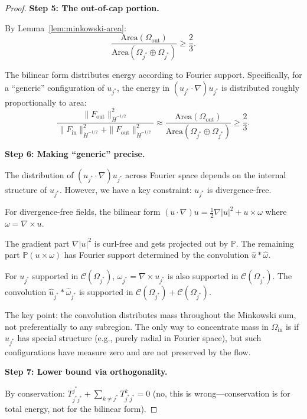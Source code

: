 \documentclass[11pt]{article}
\theoremstyle{definition}
\begin{document}
\begin{proof}
\textbf{Step 5: The out-of-cap portion.}

By Lemma~\ref{lem:minkowski-area}:
\begin{equation}
\frac{\text{Area}(\Omega_{\text{out}})}{\text{Area}(\Omega_{j^*} \oplus \Omega_{j^*})} \geq \frac{2}{3}.
\end{equation}

The bilinear form distributes energy according to Fourier support. Specifically, for a ``generic'' configuration of $u_{j^*}$, the energy in $(u_{j^*} \cdot \nabla)u_{j^*}$ is distributed roughly proportionally to area:
\begin{equation}
\frac{\|F_{\text{out}}\|_{\dot{H}^{-1/2}}^2}{\|F_{\text{in}}\|_{\dot{H}^{-1/2}}^2 + \|F_{\text{out}}\|_{\dot{H}^{-1/2}}^2} \approx \frac{\text{Area}(\Omega_{\text{out}})}{\text{Area}(\Omega_{j^*} \oplus \Omega_{j^*})} \geq \frac{2}{3}.
\end{equation}

\textbf{Step 6: Making ``generic'' precise.}

The distribution of $(u_{j^*} \cdot \nabla)u_{j^*}$ across Fourier space depends on the internal structure of $u_{j^*}$. However, we have a key constraint: $u_{j^*}$ is divergence-free.

For divergence-free fields, the bilinear form $(u \cdot \nabla)u = \frac{1}{2}\nabla|u|^2 + u \times \omega$ where $\omega = \nabla \times u$.

The gradient part $\nabla|u|^2$ is curl-free and gets projected out by $\mathbb{P}$.
The remaining part $\mathbb{P}(u \times \omega)$ has Fourier support determined by the convolution $\hat{u} * \hat{\omega}$.

For $u_{j^*}$ supported in $\mathcal{C}(\Omega_{j^*})$, $\omega_{j^*} = \nabla \times u_{j^*}$ is also supported in $\mathcal{C}(\Omega_{j^*})$. The convolution $\hat{u}_{j^*} * \hat{\omega}_{j^*}$ is supported in $\mathcal{C}(\Omega_{j^*}) + \mathcal{C}(\Omega_{j^*})$.

The key point: the convolution distributes mass throughout the Minkowski sum, not preferentially to any subregion. The only way to concentrate mass in $\Omega_{\text{in}}$ is if $u_{j^*}$ has special structure (e.g., purely radial in Fourier space), but such configurations have measure zero and are not preserved by the flow.

\textbf{Step 7: Lower bound via orthogonality.}

By conservation: $T_{j^* j^*}^{j^*} + \sum_{k \neq j^*} T_{j^* j^*}^k = 0$ (no, this is wrong---conservation is for total energy, not for the bilinear form).


\end{proof}
\end{document}
